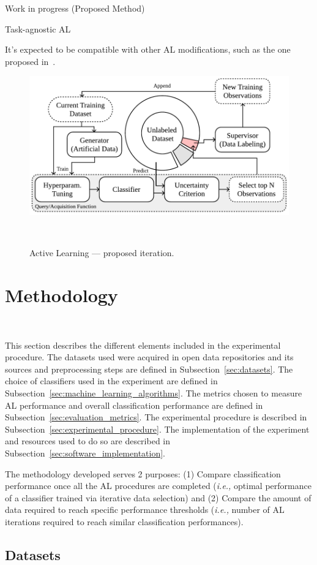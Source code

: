 \documentclass[parskip=full]{scrartcl}
\begin{document}
Work in progress (Proposed Method)

Task-agnostic AL

It's expected to be compatible with other AL modifications, such as the one
proposed in~\cite{Yoo2019}.

\begin{figure}[H]
	\centering
	\includegraphics[width=.75\linewidth]{../analysis/al_proposed}
    \caption{%
        Active Learning --- proposed iteration.
    }~\label{fig:al_proposed}
\end{figure}


\section{Methodology}~\label{sec:methodology}

This section describes the different elements included in the experimental
procedure. The datasets used were acquired in open data repositories and its
sources and preprocessing steps are defined in Subsection~\ref{sec:datasets}.
The choice of classifiers used in the experiment are defined in
Subsection~\ref{sec:machine_learning_algorithms}. The metrics chosen to
measure AL performance and overall classification performance are defined in
Subsection~\ref{sec:evaluation_metrics}. The experimental procedure is
described in Subsection~\ref{sec:experimental_procedure}. The implementation
of the experiment and resources used to do so are described in
Subsection~\ref{sec:software_implementation}.

The methodology developed serves 2 purposes: (1) Compare classification
performance once all the AL procedures are completed (\textit{i.e.,} optimal
performance of a classifier trained via iterative data selection) and (2)
Compare the amount of data required to reach specific performance thresholds
(\textit{i.e.,} number of AL iterations required to reach similar
classification performances).

\subsection{Datasets}~\label{sec:datasets}
\end{document}
